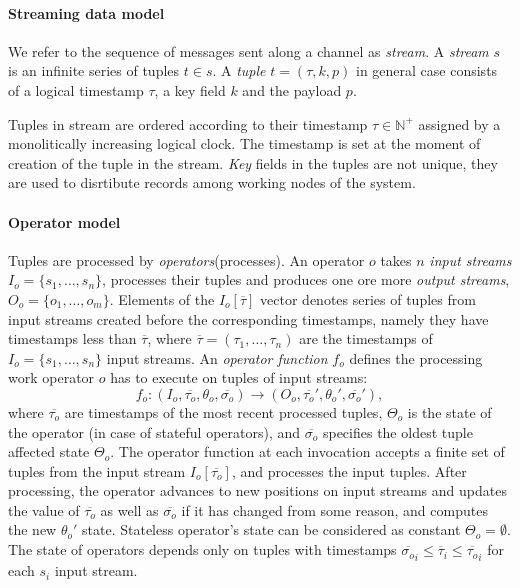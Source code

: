 \paragraph{Streaming data model}
We refer to the sequence of messages sent along a channel as \textit{stream}. A \textit{stream} \begin{math}s\end{math} is an infinite series of tuples \begin{math}t\in s\end{math}. A \textit{tuple} \begin{math}t=(\tau,k,p)\end{math} in general case consists of a logical timestamp $\tau$, a key field \(k\) and the payload \(p\).

 Tuples in stream are ordered according to their timestamp $\tau\in\mathbb{N}^{+}$ assigned by a monolitically increasing logical clock. The timestamp is set at the moment of creation of the tuple in the stream. \textit{Key} fields in the tuples are not unique, they are used to disrtibute records among working nodes of the system.\cite{pietzuch:intscaleoutandft}

\paragraph{Operator model}
Tuples are processed by \textit{operators}(processes). An operator $o$ takes $n$ \textit{input streams} $I_o=\{s_1,\dots,s_n \}$, processes their tuples and produces one ore more \textit{output streams}, $O_o=\{o_1, \dots, o_m\}$. Elements of the $I_o[\overline{\tau}]$ vector denotes series of tuples from input streams created before  the corresponding timestamps, namely they have timestamps less than $\overline{\tau}$, where $\overline{\tau}=(\tau_1,\dots,\tau_n)$  are the timestamps of  $I_o=\{s_1,\dots,s_n \}$ input streams.				
An \textit{operator function} $f_o$ defines the processing work operator $o$ has to execute on tuples of input streams:
\begin{equation}
f_o : (I_o, \overline{\tau_o},\theta_o,\overline{\sigma_o})\to (O_o, \overline{\tau_o}',\theta_o',\overline{\sigma_o}'),
\end{equation}
where $\overline{\tau_o}$  are timestamps of the most recent processed tuples, $\Theta_o$ is the state of the operator (in case of stateful operators), and $\overline{\sigma_o}$ specifies the oldest tuple affected state $\Theta_o$.
The operator function at each invocation accepts a finite set of tuples from the input stream $I_o[\overline{\tau_o}]$, and processes the input tuples. After processing, the operator advances to new positions on input streams and updates the value of $\overline{\tau_o}$ as well as  $\overline{\sigma_o}$ if it has changed from some reason, and computes the new $\theta_o'$ state. Stateless operator's state can be considered as constant $\Theta_o=\emptyset$.
The state of operators depends only on tuples with timestamps $\overline{\sigma_o}_i  \leq \overline{\tau}_i \leq \overline{\tau_o}_i$ for each $s_i$ input stream. \cite{pietzuch:intscaleoutandft}
